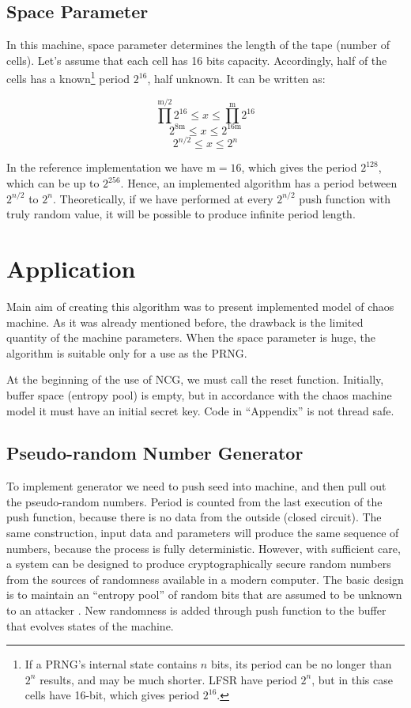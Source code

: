 \documentclass[twocolumn, a4paper, 10pt]{article}
\begin{document}
\subsection{Space Parameter}

In this machine, space parameter determines the length of the tape (number of cells). Let's assume that each cell has 16 bits capacity. Accordingly, half of the cells has a known\footnote{If a PRNG's internal state contains $n$ bits, its period can be no longer than $2^n$ results, and may be much shorter. LFSR have period $2^{n}$, but in this case cells have 16-bit, which gives period $2^{16}$.} period $2^{16}$, half unknown. It can be written as:

$$\prod^{\text{m}/2} 2^{16} \leq  x  \leq \prod^{\text{m}} 2^{16}$$
$$2^{8\text{m}} \leq  x  \leq 2^{16\text{m}}$$
$$2^{n/2} \leq  x  \leq 2^{n}$$

In the reference implementation we have $\text{m} = 16$, which gives the period $2^{128}$, which can be up to $2^{256}$. Hence, an implemented algorithm has a period between $2^{n/2}$ to $2^{n}$. Theoretically, if we have performed at every $2^{n/2}$ push function with truly random value, it will be possible to produce infinite period length.


\section{Application}

Main aim of creating this algorithm was to present implemented model of chaos machine. As it was already mentioned before, the drawback is the limited quantity of the machine parameters. When the space parameter is huge, the algorithm is suitable only for a use as the PRNG.

At the beginning of the use of NCG, we must call the reset function. Initially, buffer space (entropy pool) is empty, but in accordance with the chaos machine model it must have an initial secret key. Code in ``Appendix'' is not thread safe.

\subsection{Pseudo-random Number Generator}

To implement generator we need to push seed into machine, and then pull out the pseudo-random numbers. Period is counted from the last execution of the push function, because there is no data from the outside (closed circuit). The same construction, input data and parameters will produce the same sequence of numbers, because the process is fully deterministic. However, with sufficient care, a system can be designed to produce cryptographically secure random numbers from the sources of randomness available in a modern computer. The basic design is to maintain an ``entropy pool'' of random bits that are assumed to be unknown to an attacker \cite{2014arXiv1412.7407O}. New randomness is added through push function to the buffer that evolves states of the machine.
\end{document}
